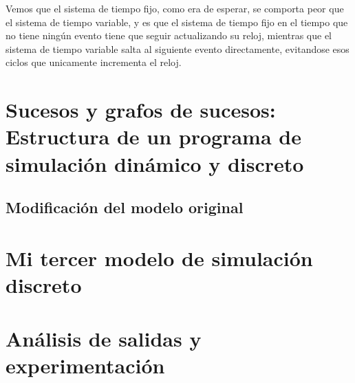 \documentclass[12pt, spanish]{article}
\begin{document}
Vemos que el sistema de tiempo fijo, como era de esperar, se comporta peor que el sistema de tiempo variable, y es que el sistema de tiempo fijo en el tiempo que no tiene ningún evento tiene que seguir actualizando su reloj, mientras que el sistema de tiempo variable salta al siguiente evento directamente, evitandose esos ciclos que unicamente incrementa el reloj.


\section{Sucesos y grafos de sucesos: Estructura de un programa de simulación dinámico y discreto}

\subsection{Modificación del modelo original}

\section{Mi tercer modelo de simulación discreto}

\section{Análisis de salidas y experimentación}

%
%
\end{document}
